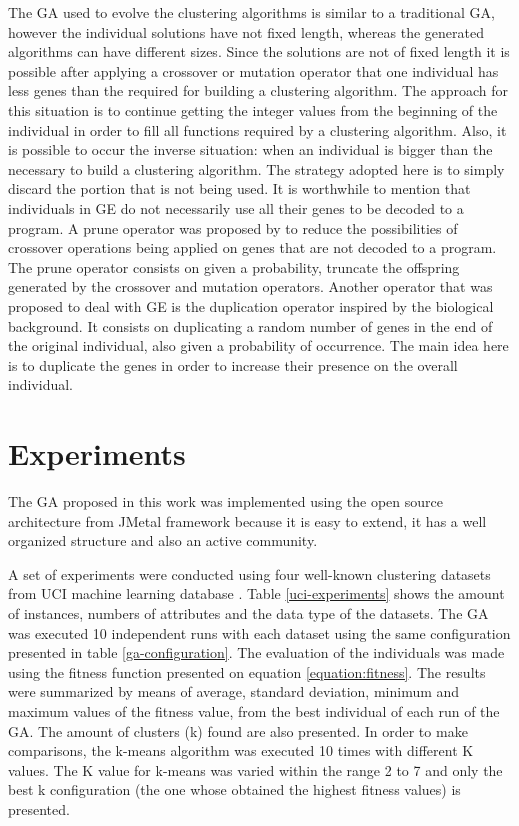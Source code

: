 \documentclass[journal]{IEEEtran}
\begin{document}
	The GA used to evolve the clustering algorithms is similar to a traditional GA, however the individual solutions have not fixed length, whereas the generated algorithms can have different sizes. Since the solutions are not of fixed length it is possible after applying a crossover or mutation operator that one individual has less genes than the required for building a clustering algorithm. The approach for this situation is to continue getting the integer values from the beginning of the individual in order to fill all functions required by a clustering algorithm. Also, it is possible to occur the inverse situation: when an individual is bigger than the necessary to build a clustering algorithm. The strategy adopted here is to simply discard the portion that is not being used. It is worthwhile to mention that individuals in GE do not necessarily use all their genes to be decoded to a program. A prune operator was proposed by \cite{ryan1998grammatical} to reduce the possibilities of crossover operations being applied on genes that are not decoded to a program. The prune operator consists on given a probability, truncate the offspring generated by the crossover and mutation operators. Another operator that was proposed to deal with GE is the duplication operator inspired by the biological background. It consists on duplicating a random number of genes in the end of the original individual, also given a probability of occurrence. The main idea here is to duplicate the genes in order to increase their presence on the overall individual.
	
	\section{Experiments} \label{sec:experiments}
	
	The GA proposed in this work was implemented using the open source architecture from JMetal framework \cite{jMetal} because it is easy to extend, it has a well organized structure and also an active community.  
	
	A set of experiments were conducted using  four well-known clustering datasets from UCI machine learning database \cite{uci}. Table \ref{uci-experiments} shows the amount of instances, numbers of attributes and the data type of the datasets. 
	The GA was executed 10 independent runs with each dataset using the same configuration presented in table \ref{ga-configuration}. The evaluation of the individuals was made using the fitness function presented on equation \ref{equation:fitness}.
	The results were summarized by means of average, standard deviation, minimum and maximum values of the fitness value,  from the best individual of each run of the GA. The amount of clusters (k) found are also presented.
	In order to make comparisons, the k-means algorithm was executed 10 times with different K values. The K value for k-means was varied within the range 2 to 7 and only the best k configuration (the one whose obtained the highest fitness values) is presented. 
	
\end{document}
